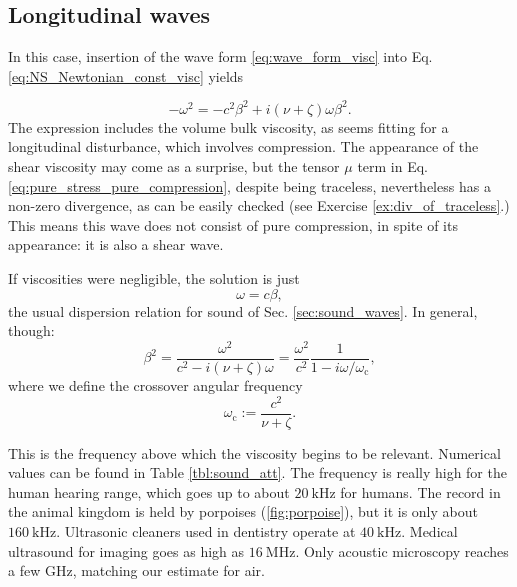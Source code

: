 \subsection{Longitudinal waves}

In this case, insertion of the wave form \ref{eq:wave_form_visc} into
Eq. \ref{eq:NS_Newtonian_const_visc} yields

\begin{equation}
  -\omega^2 = - c^2\beta^2 + i (\nu+\zeta)  \omega \beta^2 .
\end{equation}
The expression includes the volume bulk viscosity, as seems fitting
for a longitudinal disturbance, which involves compression.  The
appearance of the shear viscosity may come as a surprise, but the
tensor $\mu$ term in Eq. \ref{eq:pure_stress_pure_compression},
despite being traceless, nevertheless has a non-zero divergence, as
can be easily checked (see Exercise \ref{ex:div_of_traceless}.)  This
means this wave does not consist of pure compression, in spite of its
appearance: it is also a shear wave.

If viscosities were negligible, the solution is just
\[
\omega =  c \beta ,
\]
%
the usual dispersion relation for sound of
Sec. \ref{sec:sound_waves}. In general, though:
\begin{equation}
  \label{eq:waves_att_dispersion}
  \beta^2 =
  \frac{\omega^2}{c^2 - i(\nu+\zeta)\omega}=
  \frac{\omega^2}{c^2}\frac{1}{1 -  i\omega/\omega_\mathrm{c}},
\end{equation}
where we define the crossover angular frequency 
\[
  \omega_\mathrm{c} := \frac{c^2}{\nu + \zeta }.
\]

This is the frequency above which the viscosity begins to be relevant.
Numerical values can be found in Table \ref{tbl:sound_att}. The
frequency is really high for the human hearing range, which goes up to
about $\SI{20}{\kilo\hertz}$ for humans. The record in the animal
kingdom is held by porpoises (\ref{fig:porpoise}), but it is only
about $\SI{160}{\kilo\hertz}$. Ultrasonic cleaners used in dentistry
operate at $\SI{40}{\kilo\hertz}$. Medical ultrasound for imaging goes
as high as $\SI{16}{\mega\hertz}$. Only acoustic microscopy
\cite{kp:AM} reaches a few \si{\giga\hertz}, matching our estimate for
air.


